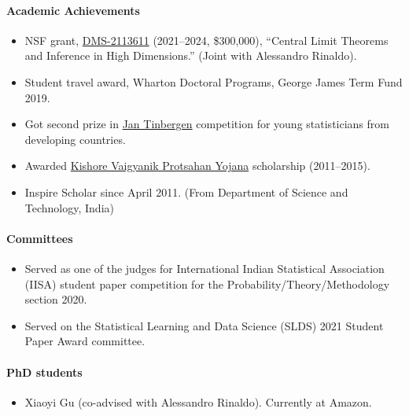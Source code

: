 \documentclass[10pt]{article}
\numberwithin{myalgctr}{section}
\begin{document}
\paragraph{Academic Achievements}
\begin{itemize}
\item NSF grant, \href{https://www.nsf.gov/awardsearch/showAward?AWD_ID=2113611&HistoricalAwards=false}{DMS-2113611} (2021--2024, \$300,000), ``Central Limit Theorems and Inference in High Dimensions.'' (Joint with Alessandro Rinaldo).
\item Student travel award, Wharton Doctoral Programs, George James Term Fund 2019.
\item Got second prize in \href{http://www.isi-web.org/index.php/activities/awards/isi-awards/tinbergen-award}{Jan Tinbergen} competition for young statisticians from developing countries.
\item Awarded \href{http://www.kvpy.iisc.ernet.in/main/fellows.htm}{Kishore Vaigyanik Protsahan Yojana} scholarship (2011--2015).
\item Inspire Scholar since April 2011. (From Department of Science and Technology, India)
\end{itemize}
\paragraph{Committees}
\begin{itemize}\itemsep0em
    \item Served as one of the judges for International Indian Statistical Association (IISA) student paper competition for the Probability/Theory/Methodology section 2020.  
    \item Served on the Statistical Learning and Data Science (SLDS) 2021 Student Paper Award committee.
\end{itemize}
\paragraph{PhD students}
\begin{itemize}
    \item Xiaoyi Gu (co-advised with Alessandro Rinaldo). Currently at Amazon.
\end{itemize}
\end{document}

